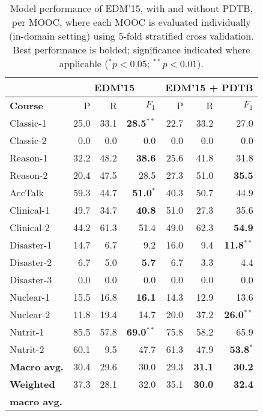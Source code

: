 \documentclass[letterpaper]{article}
\begin{document}
\begin{table}
\centering
\def\arraystretch{1.15}%
\small
\begin{tabular}{|l|r|r|r||r|r|r|}
\hline 
&
\multicolumn{3}{c||}{EDM'15} & 
\multicolumn{3}{c|}{EDM'15 + PDTB}
\\
\hline
\bf Course&  P&  R& $F_1$& P&  R& $F_1$\\
\hline
{\sc Classic-1}& 25.0& 33.1& \textbf{28.5$^{**}$}& 22.7& 33.2& 27.0\\
\hline
{\sc Classic-2}& 0.0& 0.0& 0.0& 0.0& 0.0& 0.0\\
\hline
{\sc Reason-1}& 32.2& 48.2& \textbf{38.6}& 25.6& 41.8& 31.8\\
\hline
{\sc Reason-2}& 20.4& 47.5& 28.5& 27.3& 51.0& \textbf{35.5}\\
\hline
\hline
{\sc AccTalk}& 59.3& 44.7& \textbf{51.0}$^*$& 40.3& 50.7& 44.9\\
\hline
{\sc Clinical-1}& 49.7& 34.7& \textbf{40.8}& 51.0& 27.3& 35.6\\
\hline
{\sc Clinical-2}& 44.2& 61.3& 51.4& 49.0& 62.3& \textbf{54.9}\\
\hline
{\sc Disaster-1}& 14.7& 6.7& 9.2& 16.0& 9.4& \textbf{11.8$^{**}$}\\
\hline
{\sc Disaster-2}& 6.7& 5.0& \textbf{5.7}& 6.7& 3.3& 4.4\\
\hline
{\sc Disaster-3}& 0.0& 0.0& 0.0& 0.0& 0.0& 0.0\\
\hline
{\sc Nuclear-1}& 15.5& 16.8& \textbf{16.1}& 14.3& 12.9& 13.6\\
\hline
{\sc Nuclear-2}& 11.8& 19.4& 14.7& 20.0& 37.2& \textbf{26.0$^{**}$}\\
\hline
{\sc Nutrit-1}& 85.5& 57.8& \textbf{69.0$^{**}$}& 75.8& 58.2& 65.9\\
\hline
{\sc Nutrit-2}& 60.1& 9.5& 47.7& 61.3& 47.9& \textbf{53.8$^*$}\\
\hline
\hline
\textbf{Macro avg.}& 30.4& 29.6& 30.0& 29.3& \textbf{31.1}& \textbf{30.2}\\
\hline
\textbf{Weighted} & 37.3& 28.1& 32.0& 35.1& \textbf{30.0}& \textbf{32.4}\\
\textbf{macro avg.}& & & & & &\\
\hline
\end{tabular}
\caption{Model performance of EDM'15, with and without PDTB,
per MOOC, where each MOOC is evaluated individually 
(in-domain setting) using 5-fold stratified cross validation. 
Best performance is bolded; significance indicated where applicable 
($^* p < 0.05$; $^{**}p < 0.01$).}
\label{tab:resultIn}
\end{table}
\end{document}
